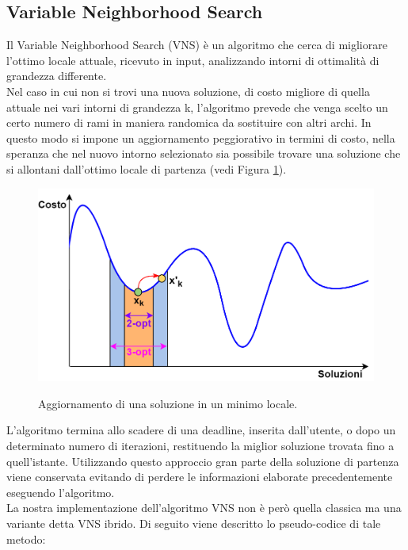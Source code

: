 \subsection{Variable Neighborhood Search}
Il Variable Neighborhood Search (VNS) è un algoritmo che cerca di migliorare l'ottimo locale attuale, ricevuto in input, analizzando intorni di ottimalità di grandezza differente.\\
Nel caso in cui non si trovi una nuova soluzione, di costo migliore di quella attuale nei vari intorni di grandezza k, l'algoritmo prevede che venga scelto un certo numero di rami in maniera randomica da sostituire con altri archi\cite{VNS}. In questo modo si impone un aggiornamento peggiorativo in termini di costo, nella speranza che nel nuovo intorno selezionato sia possibile trovare una soluzione che si allontani dall'ottimo locale di partenza (vedi Figura \ref{VNS_img}).\\
 \begin{figure}[H] 
\begin{center} 
  \includegraphics[scale=0.4]{Images/VNS}\\ 
  \caption{\footnotesize{Aggiornamento di una soluzione in un minimo locale.}}
  \label{VNS_img}
\end{center}
\end{figure}
L'algoritmo termina allo scadere di una deadline, inserita dall'utente, o dopo un determinato numero di iterazioni, restituendo la miglior soluzione trovata fino a quell'istante. Utilizzando questo approccio gran parte della soluzione di partenza viene conservata evitando di perdere le informazioni elaborate precedentemente eseguendo l'algoritmo.\\
La nostra implementazione dell'algoritmo VNS non è però quella classica ma una variante detta VNS ibrido\cite{hybrid_VNS}. Di seguito viene descritto lo pseudo-codice di tale metodo:\\\\
